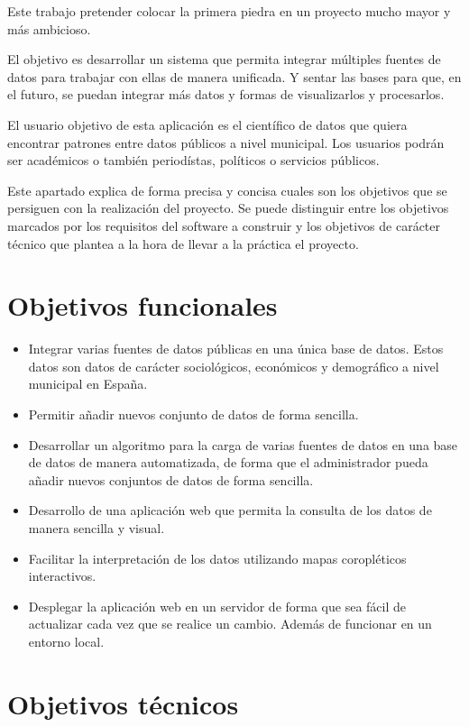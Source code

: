 
Este trabajo pretender colocar la primera piedra en un proyecto mucho mayor y más ambicioso.

El objetivo es desarrollar un sistema que permita integrar múltiples fuentes de datos para trabajar con ellas de manera unificada. Y sentar las bases para que, en el futuro, se puedan integrar más datos y formas de visualizarlos y procesarlos.

El usuario objetivo de esta aplicación es el científico de datos que quiera encontrar patrones entre datos públicos a nivel  municipal. Los usuarios podrán ser académicos o también periodístas, políticos o servicios públicos.

Este apartado explica de forma precisa y concisa cuales son los objetivos que se persiguen con la realización del proyecto. Se puede distinguir entre los objetivos marcados por los requisitos del software a construir y los objetivos de carácter técnico que plantea a la hora de llevar a la práctica el proyecto.

\section{Objetivos funcionales}

\begin{itemize}
	\item Integrar varias fuentes de datos públicas en una única base de datos. Estos datos son datos de carácter sociológicos, económicos y demográfico a nivel municipal en España.
	\item Permitir añadir nuevos conjunto de datos de forma sencilla.
	\item Desarrollar un algoritmo para la carga de varias fuentes de datos en una base de datos de manera automatizada, de forma que el administrador pueda añadir nuevos conjuntos de datos de forma sencilla.
	\item Desarrollo de una aplicación web que permita la consulta de los datos de manera sencilla y visual.
	\item Facilitar la interpretación de los datos utilizando mapas coropléticos interactivos.
	\item Desplegar la aplicación web en un servidor de forma que sea fácil de actualizar cada vez que se realice un cambio. Además de funcionar en un entorno local.
\end{itemize}

\section{Objetivos técnicos}

